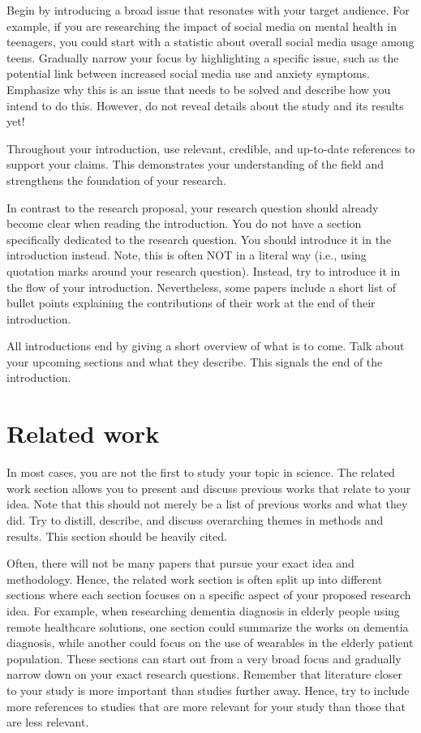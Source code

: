 \documentclass[10pt,a4paper]{article}
\begin{document}
Begin by introducing a broad issue that resonates with your target audience. For example, if you are researching the impact of social media on mental health in teenagers, you could start with a statistic about overall social media usage among teens. Gradually narrow your focus by highlighting a specific issue, such as the potential link between increased social media use and anxiety symptoms. Emphasize why this is an issue that needs to be solved and describe how you intend to do this. However, do not reveal details about the study and its results yet! 

Throughout your introduction, use relevant, credible, and up-to-date references to support your claims. This demonstrates your understanding of the field and strengthens the foundation of your research.

In contrast to the research proposal, your research question should already become clear when reading the introduction. You do not have a section specifically dedicated to the research question. You should introduce it in the introduction instead. Note, this is often NOT in a literal way (i.e., using quotation marks around your research question). Instead, try to introduce it in the flow of your introduction. Nevertheless, some papers include a short list of bullet points explaining the contributions of their work at the end of their introduction. 

All introductions end by giving a short overview of what is to come. Talk about your upcoming sections and what they describe. This signals the end of the introduction.

\section{Related work}\label{sec:relatedwork}
In most cases, you are not the first to study your topic in science. The related work section allows you to present and discuss previous works that relate to your idea. Note that this should not merely be a list of previous works and what they did. Try to distill, describe, and discuss overarching themes in methods and results. This section should be heavily cited. 

Often, there will not be many papers that pursue your exact idea and methodology. Hence, the related work section is often split up into different sections where each section focuses on a specific aspect of your proposed research idea. For example, when researching dementia diagnosis in elderly people using remote healthcare solutions, one section could summarize the works on dementia diagnosis, while another could focus on the use of wearables in the elderly patient population. These sections can start out from a very broad focus and gradually narrow down on your exact research questions. Remember that literature closer to your study is more important than studies further away. Hence, try to include more references to studies that are more relevant for your study than those that are less relevant.
\end{document}

